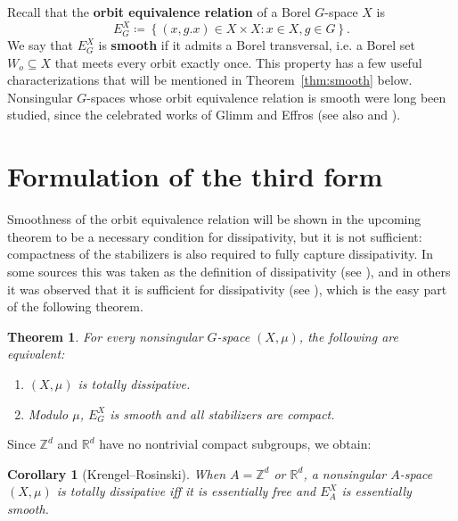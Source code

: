 \documentclass{amsart}
\numberwithin{equation}{subsection}
\newtheorem{cor}[thm]{Corollary}
\newtheorem{mainthm}{Theorem}
\renewcommand{\themainthm}{\Alph{mainthm}}
\begin{document}
Recall that the {\bf orbit equivalence relation} of a Borel \(G\)-space \(X\) is
\[E_{G}^{X}\coloneqq \left\{\left(x,g.x\right)\in X\times X:x\in X,g\in G\right\}.\]
We say that \(E_{G}^{X}\) is {\bf smooth} if it admits a Borel transversal, i.e. a Borel set \(W_{o}\subseteq X\) that meets every orbit exactly once. This property has a few useful characterizations that will be mentioned in Theorem~\ref{thm:smooth} below. Nonsingular \(G\)-spaces whose orbit equivalence relation is smooth were long been studied, since the celebrated works of Glimm and Effros \cite{glimm1961locally, effros1965transformation} (see also \cite[\S5]{feldman1978orbit} and \cite[\S2.1]{zimmer2013ergodic}).

\section{Formulation of the third form}

Smoothness of the orbit equivalence relation will be shown in the upcoming theorem to be a necessary condition for dissipativity, but it is not sufficient: compactness of the stabilizers is also required to fully capture dissipativity. In some sources this was taken as the definition of dissipativity (see \cite[Definition 2.1(i)]{danilenko2022haagerup}), and in others it was observed that it is sufficient for dissipativity (see \cite[\S2.11]{blayac2025patterson}), which is the easy part of the following theorem.

\renewcommand{\themainthm}{C}
\begin{mainthm}
\label{mthm:disssmooth}
For every nonsingular \(G\)-space \(\left(X,\mu\right)\), the following are equivalent:
\begin{enumerate}
    \item \(\left(X,\mu\right)\) is totally dissipative.
    \item Modulo \(\mu\), \(E_{G}^{X}\) is smooth and all stabilizers are compact.
\end{enumerate}
\end{mainthm}
\renewcommand{\themainthm}{\Alph{mainthm}}

Since \(\mathbb{Z}^{d}\) and \(\mathbb{R}^{d}\) have no nontrivial compact subgroups, we obtain:

\begin{cor}[Krengel--Rosinski]
When \(A=\mathbb{Z}^{d}\) or \(\mathbb{R}^{d}\), a nonsingular \(A\)-space \(\left(X,\mu\right)\) is totally dissipative iff it is essentially free and \(E_{A}^{X}\) is essentially smooth.
\end{cor}
\end{document}
